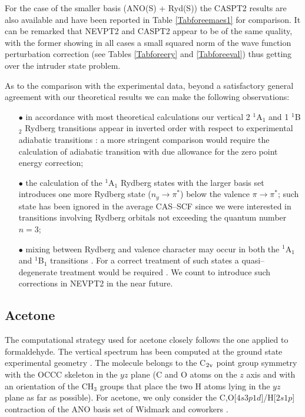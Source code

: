 \documentclass[global,referee]{svjour}
\begin{document}
For the case of the smaller basis (ANO(S) + Ryd(S)) the CASPT2 results are also available 
\cite{Merch95} and have been reported in Table \ref{Tabforeemaes1} for comparison.
It can be remarked that NEVPT2 and CASPT2 appear to be of the same quality, with the former showing in
all cases a small squared norm of the wave function perturbation correction (see Tables 
\ref{Tabforeery} and \ref{Tabforeeval}) thus getting over the intruder state problem.

As to the comparison with the experimental data, beyond a satisfactory general agreement with our
theoretical results we can make the following observations:
\begin{itemize}
\item[$\bullet$] in accordance with most theoretical calculations our vertical 2 $^1$A$_1$  and 1 $^1$B$_2$
Rydberg transitions appear in inverted order with respect to experimental adiabatic transitions
\cite{Robin85}: a more stringent comparison would require the calculation of adiabatic transition
with due allowance for the zero point energy correction;
\item[$\bullet$] the calculation of the $^1$A$_1$ Rydberg states with the larger basis set introduces one more
Rydberg state ($n_y\rightarrow\pi^*$) below the valence $\pi\rightarrow\pi^*$; such state has been ignored
in the average CAS--SCF since we were 
interested in transitions involving Rydberg orbitals not exceeding
the quantum number $n=3$;
\item[$\bullet$] mixing between Rydberg and valence character may occur in both the $^1$A$_1$ and $^1$B$_1$
transitions \cite{Merch95,Hachey95}. For a correct treatment of such states a quasi--degenerate treatment
would be required \cite{Durand87,Finley98}. We count to introduce such corrections in NEVPT2 in the near future.
\end{itemize}




\subsection{Acetone}
\label{acetsec}

The computational strategy used for acetone closely follows the one applied to formaldehyde.
The vertical spectrum has been computed at the ground state 
experimental geometry \cite{Nelson65}. The molecule belongs to the C$_{\rm 2v}$ point group symmetry 
with the OCCC skeleton in the $yz$ plane (C and O atoms on the $z$ axis and with an orientation of the CH$_3$ 
groups that place the two H atoms lying in the $yz$ plane as far as possible). 
For acetone, we only consider the C,O[$4s3p1d$]/H[$2s1p$] contraction of the ANO basis set
of Widmark and coworkers \cite{Widma90}.
\end{document}
